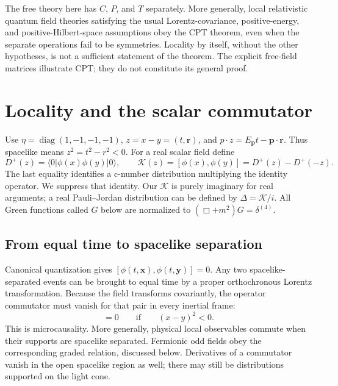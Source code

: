 \documentclass[11pt]{article}
\newcommand{\diag}{\operatorname{diag}}
\newcommand{\vac}{\lvert0\rangle}
\newcommand{\vbra}{\langle0\rvert}
\begin{document}
\begin{remarkbox}
The free theory here has \(C\), \(P\), and \(T\) separately. More generally,
local relativistic quantum field theories satisfying the usual
Lorentz-covariance, positive-energy, and positive-Hilbert-space assumptions
obey the CPT theorem, even when the separate operations fail to be
symmetries. Locality by itself, without the other hypotheses, is not
a sufficient statement of the theorem. The explicit free-field matrices
illustrate CPT; they do not constitute its general proof.
\end{remarkbox}



\section{Locality and the scalar commutator}
\begin{keyidea}
Use \(\eta=\diag(1,-1,-1,-1)\), \(z=x-y=(t,\bm r)\), and
\(p\cdot z=E_{\bm p}t-\bm p\cdot\bm r\). Thus spacelike means
\(z^2=t^2-r^2<0\). For a real scalar field define
\[
 D^+(z)=\vbra\phi(x)\phi(y)\vac,\qquad
 \mathcal K(z)=[\phi(x),\phi(y)]=D^+(z)-D^+(-z).
\]
The last equality identifies a c-number distribution multiplying the
identity operator. We suppress that identity. Our \(\mathcal K\) is purely
imaginary for real arguments; a real Pauli--Jordan distribution can be
defined by \(\Delta=\mathcal K/i\). All Green functions called \(G\) below
are normalized to \((\Box+m^2)G=\delta^{(4)}\).
\end{keyidea}
\subsection{From equal time to spacelike separation}
Canonical quantization gives \([\phi(t,\bm x),\phi(t,\bm y)]=0\).
Any two spacelike-separated events can be brought to equal time by a
proper orthochronous Lorentz transformation. Because the field transforms
covariantly, the operator commutator must vanish for that pair in every
inertial frame:
\begin{equation}
 [\phi(x),\phi(y)]=0\qquad\text{if}\qquad (x-y)^2<0.
 \label{k-eq:locality}
\end{equation}
This is microcausality. More generally, physical local observables
commute when their supports are spacelike separated. Fermionic odd
fields obey the corresponding graded relation, discussed below.
Derivatives of a commutator vanish in the open spacelike region as well;
there may still be distributions supported on the light cone.
\end{document}
